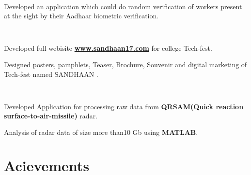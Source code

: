\documentclass[a4paper]{deedy-resume} %
\begin{document}
\begin{minipage}[t]{0.66\textwidth}
\\

\begin{tightitemize}
\item Developed an application which could do random verification of workers present at the sight by their Aadhaar biometric verification.

\end{tightitemize}
\sectionspace
{}\\

\begin{tightitemize}
\item Developed full webisite \href{http://www.sandhaan17.com} {\bf www.sandhaan17.com}  for college Tech-fest.
\item Designed posters, pamphlets, Teaser, Brochure, Souvenir and digital marketing of Tech-fest named SANDHAAN .
\end{tightitemize}
\sectionspace
 \\

\begin{tightitemize}
\item Developed Application for processing  raw data from \textbf{ QRSAM(Quick reaction surface-to-air-missile)} radar.
\item Analysis of radar data of size more than10 Gb using \textbf{MATLAB}.
\end{tightitemize}


\sectionspace %


\section{Acievements} 


\end{minipage}
\end{document}

